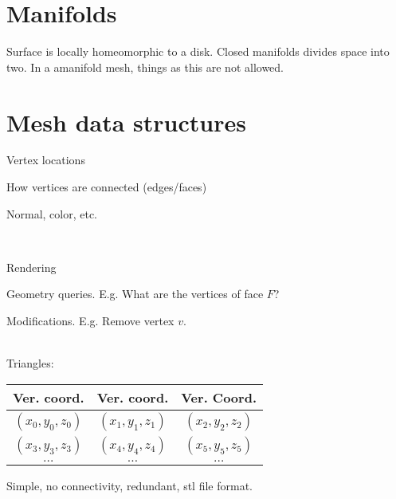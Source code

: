 \begin{compactdesc}
\section{Manifolds}
Surface is locally homeomorphic to a disk. Closed manifolds divides space into two. In a amanifold mesh, things as this are not allowed.
\section{Mesh data structures}
	\item[\lp{Geometry}] Vertex locations
	\item[\lp{Topology}] How vertices are connected (edges/faces)
	\item[\lp{Attributes}] Normal, color, etc.
	\item[\lp{Operations to be supported}] \hfill\\
		\begin{enumerate*}[label=\protect\circled{\arabic*},itemjoin=]
			\item Rendering\\
			\item Geometry queries. E.g. What are the vertices of face $F$?\\
			\item Modifications. E.g. Remove vertex $v$.
		\end{enumerate*}
	\item[\lp{Triangle List}]\hfill\\
		Triangles:
		\begin{center}
			\begin{tabular}[]{c@{\hskip +0.15ex}c@{\hskip +0.15ex}c@{\hskip +0.15ex}}
				Ver. coord.&Ver. coord.&Ver. Coord.\\
				\toprule
				\!\!\!$\scriptscriptstyle(x_0,y_0,z_0)$&$\scriptscriptstyle(x_1,y_1,z_1)$&$\scriptscriptstyle(x_2,y_2,z_2)$\\
				\!\!\!$\scriptscriptstyle(x_3,y_3,z_3)$&$\scriptscriptstyle(x_4,y_4,z_4)$&$\scriptscriptstyle(x_5,y_5,z_5)$\\
				\!\!\!$\scriptscriptstyle\ldots$&$\scriptscriptstyle\ldots$&$\scriptscriptstyle\ldots$\\
				\bottomrule
			\end{tabular}
			\end{center}
			Simple, no connectivity, redundant, stl file format.
		\item[\lp{Indexed face set}]\hfill\\

\end{compactdesc}
